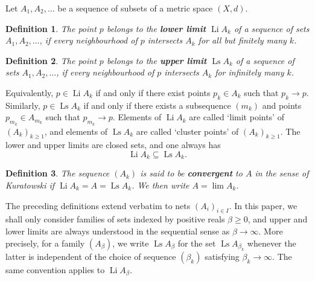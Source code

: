 \documentclass[11pt,a4paper,longbibliography]{amsart}
\numberwithin{equation}{section}
\theoremstyle{plain}
\newtheorem{defn}{Definition}[section]
\theoremstyle{definition}
\theoremstyle{remark}
\begin{document}
	
	Let $A_1,A_2,\ldots$ be a sequence of subsets of a metric space $(X,d)$.
	\begin{defn}
		The point $p$ belongs to the \textbf{lower limit} $\operatorname{Li} A_k$ of a sequence of sets $A_1,A_2,\ldots$,  if every neighbourhood of $p$ intersects $A_k$ for all but finitely many $k$. 
	\end{defn}
	\begin{defn}
		The point $p$ belongs to the \textbf{upper limit} $\operatorname{Ls} A_k$ of a sequence of sets $A_1,A_2,\ldots$, if every neighbourhood of $p$ intersects $A_k$ for infinitely many $k$. 
	\end{defn}
	
	Equivalently, $   p\in \operatorname{Li} A_k$ if and only if there exist points $p_k\in A_k$ such that $p_k\to p$. 
	Similarly, $p\in \operatorname{Ls} A_k$ 
	if and only if there exists a subsequence $(m_k)$ and points $p_{m_k}\in A_{m_k}$ such that $p_{m_k}\to p$.
	Elements of $\operatorname{Li}A_k$ are called `limit points' of  $(A_k)_{k\geq1}$, and elements of $\operatorname{Ls}A_k$ are called `cluster points' of $(A_k)_{k\geq1}$.
	The lower and upper limits are closed sets, and one always has
	\begin{equation}
		\operatorname{Li} A_k
		\subseteq
		\operatorname{Ls} A_k.
	\end{equation}
	
	\begin{defn}
		The sequence $(A_k)$ is said to be \textbf{convergent} to $A$ in the sense of Kuratowski if $\operatorname{Li} A_k=A =\operatorname{Ls} A_k$. We then write $A=\operatorname{lim}A_k$.
	\end{defn}
	The preceding definitions extend verbatim to nets $(A_i)_{i\in I}$. In this paper, we shall only consider families of sets indexed by positive reals $\beta\geq 0$, and upper and lower limits are always understood in the sequential sense as $\beta\to\infty$. More precisely, for a family $(A_\beta)$, we write $\operatorname{Ls}A_\beta$ for the set $\operatorname{Ls}A_{\beta_k}$ whenever the latter is independent of the choice of sequence $(\beta_k)$ satisfying $\beta_k\to\infty$. The same convention applies to $\operatorname{Li}A_\beta$.
	
\end{document}
